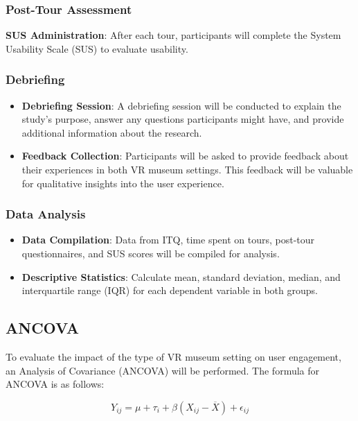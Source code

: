 \documentclass[conference]{IEEEtran}
\begin{document}
\subsubsection{Post-Tour Assessment}
\begin{itemize}
\textbf{SUS Administration}: After each tour, participants will complete the System Usability Scale (SUS) to evaluate usability.
\end{itemize}
\subsubsection{Debriefing}
\begin{itemize}
    \item \textbf{Debriefing Session}: A debriefing session will be conducted to explain the study's purpose, answer any questions participants might have, and provide additional information about the research.
    \item \textbf{Feedback Collection}: Participants will be asked to provide feedback about their experiences in both VR museum settings. This feedback will be valuable for qualitative insights into the user experience.
\end{itemize}
\subsubsection{Data Analysis}
\begin{itemize}
    \item \textbf{Data Compilation}: Data from ITQ, time spent on tours, post-tour questionnaires, and SUS scores will be compiled for analysis.
    \item \textbf{Descriptive Statistics}: Calculate mean, standard deviation, median, and interquartile range (IQR) for each dependent variable in both groups.
\end{itemize}
\subsection{ANCOVA}

To evaluate the impact of the type of VR museum setting on user engagement, an Analysis of Covariance (ANCOVA) will be performed. The formula for ANCOVA is as follows:

\[ Y_{ij} = \mu + \tau_i + \beta(X_{ij} - \overline{X}) + \epsilon_{ij} \]
\end{document}
